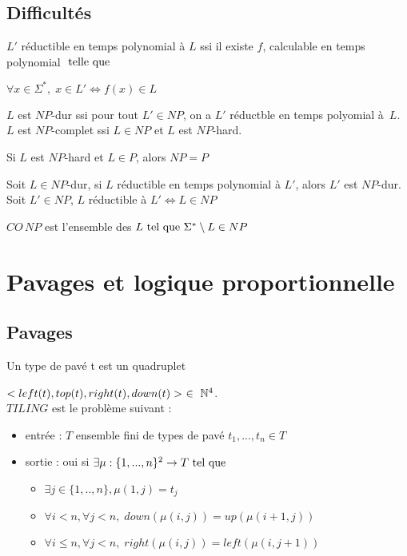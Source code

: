 \documentclass[10pt,a4paper]{article}
\begin{document}
 \subsection{Difficultés}
 \begin{definition}{}$L'$ réductible en temps polynomial à $L$ ssi il existe $f$, calculable en temps polynomial $\tq[le]$

$\forall x \in \Sigma ^*, \; x \in L' \Leftrightarrow f(x) \in L$
 \end{definition}
 \begin{definition}{}$L$ est $NP$-dur ssi pour tout $L' \in NP$, on a $L'$ réductble en temps polyomial à~$L$.\\
 $L$ est $NP$-complet ssi $L \in NP$ et $L$ est $NP$-hard.
 \end{definition}
\begin{rem} 
Si $L$ est $NP$-hard et  $L \in P$, alors $NP = P$
\end{rem}
 
\begin{prop}
 Soit $L \in NP$-dur, si $L$ réductible en temps polynomial à $L'$, alors $L'$ est $NP$-dur.\\
Soit $L' \in NP$, $L$ réductible à $L' \Leftrightarrow L \in NP$
\end{prop}
 
 \begin{definition}$CO\,NP$ est l'ensemble des $L \tq \Sigma^* \setminus L \in NP$
 \end{definition}
 \section{Pavages et logique proportionnelle}
 
 \subsection{Pavages} 
\begin{definition}
Un type de pavé t est un quadruplet 

$< left(t), top(t), right(t), down(t) >~ \in~ \Ns^4$.\\
 $TILING$ est le problème suivant : \begin{itemize}
 \item entrée : $T$ ensemble fini de types de pavé $t_1, ..., t_n \in T$
\item sortie : oui si $\exists \mu : \{ 1, ..., n\} ^2 \rightarrow T \tq$ 
\begin{itemize}
\item $\exists j \in \{1, .., n\}, \mu(1,j) = t_j$
\item $\forall i < n, \forall j < n, \; down(\mu(i,j)) = up(\mu(i+1, j))$
\item $\forall i \leq n , \forall j < n, \; right (\mu (i,j)) = left( \mu (i, j+1))$
\end{itemize}
\end{itemize}
\end{definition}
\end{document}

